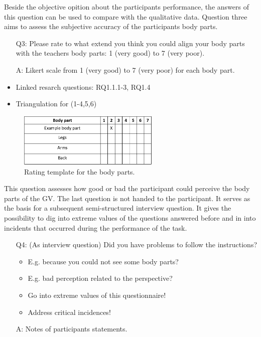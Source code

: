 Beside the objective opition about the participants performance, the answers of this question can be used to compare with the qualitative data. Question three aims to assess the subjective accuracy of the participants body parts.
\begin{itemize}
	\item[Q3:] Please rate to what extend you think you could align your body parts with the teachers body parts: 1 (very good) to 7 (very poor). 
	\item[A:] Likert scale from 1 (very good) to 7 (very poor) for each body part.
	\item Linked resarch questions: RQ1.1.1-3, RQ1.4
	\item Triangulation for (1-4,5,6)
\end{itemize} 
\begin{figure}[H]
	\centering
	\includegraphics[width=0.6\textwidth]{figures/body-parts-acc.png}
	\caption[Rating template: body parts]{Rating template for the body parts.}
	\label{fig:bodypartsacc}
\end{figure}
This question assesses how good or bad the participant could perceive the body parts of the GV. The last question is not handed to the participant. It serves as the basis for a subsequent semi-structured interview question. It gives the possibility to dig into extreme values of the questions answered before and in into incidents that occurred during the performance of the task.
\begin{itemize}
	\item[Q4:] (As interview question) Did you have problems to follow the instructions? 
	\begin{itemize}
		\item E.g. because you could not see some body parts?
		\item E.g. bad perception related to the perspective?
		\item Go into extreme values of this questionnaire! 
		\item Address critical incidences!
	\end{itemize}
	\item[A:] Notes of participants statements.
\end{itemize}

